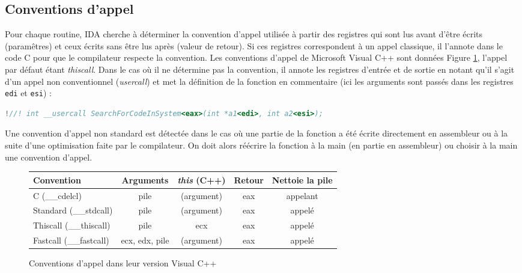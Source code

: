 \subsection{Conventions d'appel}

Pour chaque routine, IDA cherche à déterminer la convention d'appel utilisée à partir des registres qui sont lus avant d'être écrits (paramêtres) et ceux écrits sans être lus après (valeur de retour). Si ces registres correspondent à un appel classique, il l'annote dans le code C pour que le compilateur respecte la convention. Les conventions d'appel de Microsoft Visual C++ sont données Figure \ref{fig:AThierry_callingconvention}, l'appel par défaut étant \emph{thiscall}. Dans le cas où il ne détermine pas la convention, il annote les registres d'entrée et de sortie en notant qu'il s'agit d'un appel non conventionnel (\emph{usercall}) et met la définition de la fonction en commentaire (ici les arguments sont passés dans les registres \texttt{edi} et \texttt{esi}) :
\begin{changemargin}{-0.4cm}{-0.4cm}
\begin{lstlisting}[language={C}, escapechar=!]
!//! int __usercall SearchForCodeInSystem<eax>(int *a1<edi>, int a2<esi>);
\end{lstlisting}
\end{changemargin}

Une convention d'appel non standard est détectée dans le cas où une partie de la fonction a été écrite directement en assembleur ou à la suite d'une optimisation faite par le compilateur. On doit alors réécrire la fonction à la main (en partie en assembleur) ou choisir à la main une convention d'appel.

\begin{figure}
\begin{center}
\begin{tabular}{|l|c|c|c|c|}
\hline 
Convention & Arguments & \emph{this} (C++) & Retour & Nettoie la pile\\
\hline
C (\_\_cdelcl) & pile & (argument) & eax & appelant\\
Standard (\_\_stdcall) & pile & (argument) & eax & appelé\\
Thiscall (\_\_thiscall) & pile & ecx & eax & appelé\\
Fastcall (\_\_fastcall) & ecx, edx, pile & (argument) & eax & appelé\\
\hline
\end{tabular}
\end{center}
\caption{Conventions d'appel dans leur version Visual C++}
\label{fig:AThierry_callingconvention}
\end{figure}

